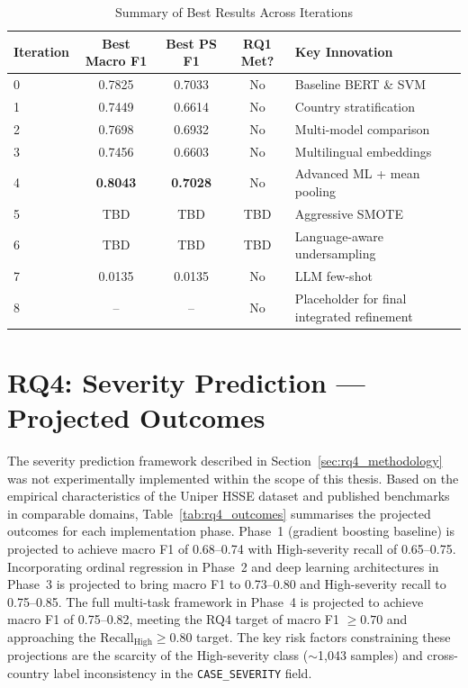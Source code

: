 \documentclass[11pt, titlepage, bibliography=totoc]{scrreprt}
\begin{document}
\begin{table}[htbp]
\centering
\caption{Summary of Best Results Across Iterations}
\label{tab:results-summary}
\begin{tabular}{@{}lcccp{4cm}@{}}
\toprule
\textbf{Iteration} & \textbf{Best Macro F1} & \textbf{Best PS F1} & \textbf{RQ1 Met?} & \textbf{Key Innovation} \\
\midrule
0 & 0.7825 & 0.7033 & No & Baseline BERT \& SVM \\
1 & 0.7449 & 0.6614 & No & Country stratification \\
2 & 0.7698 & 0.6932 & No & Multi-model comparison \\
3 & 0.7456 & 0.6603 & No & Multilingual embeddings \\
4 & \textbf{0.8043} & \textbf{0.7028} & No & Advanced ML + mean pooling \\
5 & TBD   & TBD   & TBD & Aggressive SMOTE \\
6 & TBD   & TBD   & TBD & Language-aware undersampling \\
7 & 0.0135 & 0.0135 & No & LLM few-shot \\
8 & -- & -- & No & Placeholder for final integrated refinement \\
\bottomrule
\end{tabular}
\end{table}

\section{RQ4: Severity Prediction --- Projected Outcomes}
\label{sec:rq4_results}

The severity prediction framework described in Section~\ref{sec:rq4_methodology} was not experimentally implemented within the scope of this thesis. Based on the empirical characteristics of the Uniper HSSE dataset and published benchmarks in comparable domains, Table~\ref{tab:rq4_outcomes} summarises the projected outcomes for each implementation phase. Phase~1 (gradient boosting baseline) is projected to achieve macro F1 of 0.68--0.74 with High-severity recall of 0.65--0.75. Incorporating ordinal regression in Phase~2 and deep learning architectures in Phase~3 is projected to bring macro F1 to 0.73--0.80 and High-severity recall to 0.75--0.85. The full multi-task framework in Phase~4 is projected to achieve macro F1 of 0.75--0.82, meeting the RQ4 target of macro F1 $\geq 0.70$ and approaching the $\text{Recall}_\text{High} \geq 0.80$ target. The key risk factors constraining these projections are the scarcity of the High-severity class ($\sim$1{,}043 samples) and cross-country label inconsistency in the \texttt{CASE\_SEVERITY} field.
\end{document}
